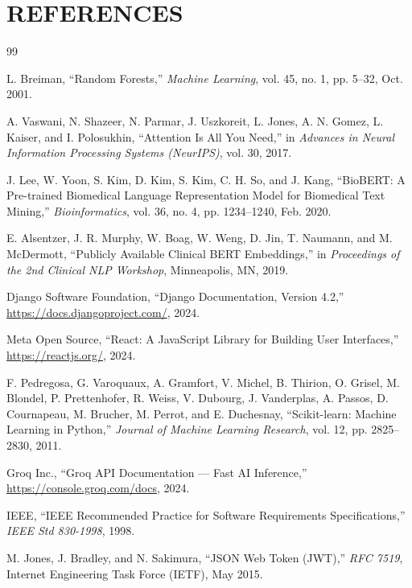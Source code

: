 \chapter{REFERENCES}

\begin{thebibliography}{99}

L. Breiman, ``Random Forests,'' \textit{Machine Learning}, vol. 45, no. 1, pp. 5--32, Oct. 2001.

A. Vaswani, N. Shazeer, N. Parmar, J. Uszkoreit, L. Jones, A. N. Gomez, L. Kaiser, and I. Polosukhin, ``Attention Is All You Need,'' in \textit{Advances in Neural Information Processing Systems (NeurIPS)}, vol. 30, 2017.

J. Lee, W. Yoon, S. Kim, D. Kim, S. Kim, C. H. So, and J. Kang, ``BioBERT: A Pre-trained Biomedical Language Representation Model for Biomedical Text Mining,'' \textit{Bioinformatics}, vol. 36, no. 4, pp. 1234--1240, Feb. 2020.

E. Alsentzer, J. R. Murphy, W. Boag, W. Weng, D. Jin, T. Naumann, and M. McDermott, ``Publicly Available Clinical BERT Embeddings,'' in \textit{Proceedings of the 2nd Clinical NLP Workshop}, Minneapolis, MN, 2019.

Django Software Foundation, ``Django Documentation, Version 4.2,'' \url{https://docs.djangoproject.com/}, 2024.

Meta Open Source, ``React: A JavaScript Library for Building User Interfaces,'' \url{https://reactjs.org/}, 2024.

F. Pedregosa, G. Varoquaux, A. Gramfort, V. Michel, B. Thirion, O. Grisel, M. Blondel, P. Prettenhofer, R. Weiss, V. Dubourg, J. Vanderplas, A. Passos, D. Cournapeau, M. Brucher, M. Perrot, and E. Duchesnay, ``Scikit-learn: Machine Learning in Python,'' \textit{Journal of Machine Learning Research}, vol. 12, pp. 2825--2830, 2011.

Groq Inc., ``Groq API Documentation --- Fast AI Inference,'' \url{https://console.groq.com/docs}, 2024.

IEEE, ``IEEE Recommended Practice for Software Requirements Specifications,'' \textit{IEEE Std 830-1998}, 1998.

M. Jones, J. Bradley, and N. Sakimura, ``JSON Web Token (JWT),'' \textit{RFC 7519}, Internet Engineering Task Force (IETF), May 2015.


\end{thebibliography}
